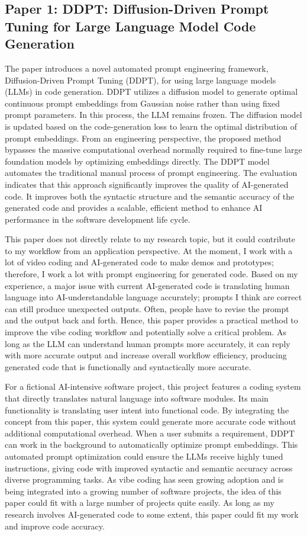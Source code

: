 \documentclass[11pt]{article}
\begin{document}
\subsection{Paper 1: DDPT: Diffusion-Driven Prompt Tuning for Large Language Model Code Generation}
The paper introduces a novel automated prompt engineering framework, Diffusion-Driven Prompt Tuning (DDPT), for using large language models (LLMs) in code generation. DDPT utilizes a diffusion model to generate optimal continuous prompt embeddings from Gaussian noise rather than using fixed prompt parameters. In this process, the LLM remains frozen. The diffusion model is updated based on the code-generation loss to learn the optimal distribution of prompt embeddings. From an engineering perspective, the proposed method bypasses the massive computational overhead normally required to fine-tune large foundation models by optimizing embeddings directly. The DDPT model automates the traditional manual process of prompt engineering. The evaluation indicates that this approach significantly improves the quality of AI-generated code. It improves both the syntactic structure and the semantic accuracy of the generated code and provides a scalable, efficient method to enhance AI performance in the software development life cycle.

This paper does not directly relate to my research topic, but it could contribute to my workflow from an application perspective. At the moment, I work with a lot of video coding and AI-generated code to make demos and prototypes; therefore, I work a lot with prompt engineering for generated code. Based on my experience, a major issue with current AI-generated code is translating human language into AI-understandable language accurately; prompts I think are correct can still produce unexpected outputs. Often, people have to revise the prompt and the output back and forth. Hence, this paper provides a practical method to improve the vibe coding workflow and potentially solve a critical problem. As long as the LLM can understand human prompts more accurately, it can reply with more accurate output and increase overall workflow efficiency, producing generated code that is functionally and syntactically more accurate. 

For a fictional AI-intensive software project, this project features a coding system that directly translates natural language into software modules. Its main functionality is translating user intent into functional code. By integrating the concept from this paper, this system could generate more accurate code without additional computational overhead. When a user submits a requirement, DDPT can work in the background to automatically optimize prompt embeddings. This automated prompt optimization could ensure the LLMs receive highly tuned instructions, giving code with improved syntactic and semantic accuracy across diverse programming tasks. As vibe coding has seen growing adoption and is being integrated into a growing number of software projects, the idea of this paper could fit with a large number of projects quite easily. As long as my research involves AI-generated code to some extent, this paper could fit my work and improve code accuracy. 
\end{document}
